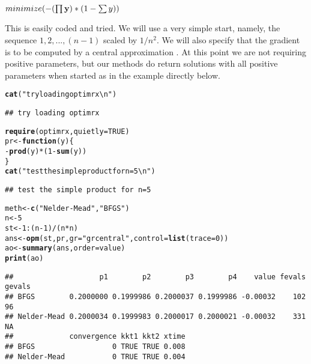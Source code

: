 \documentclass[11pt]{article}\usepackage[]{graphicx}\usepackage[]{color}
\makeatletter
\newcommand{\hlnum}[1]{\textcolor[rgb]{0.686,0.059,0.569}{#1}}%
\newcommand{\hlstr}[1]{\textcolor[rgb]{0.192,0.494,0.8}{#1}}%
\newcommand{\hlopt}[1]{\textcolor[rgb]{0,0,0}{#1}}%
\newcommand{\hlstd}[1]{\textcolor[rgb]{0.345,0.345,0.345}{#1}}%
\newcommand{\hlkwa}[1]{\textcolor[rgb]{0.161,0.373,0.58}{\textbf{#1}}}%
\newcommand{\hlkwb}[1]{\textcolor[rgb]{0.69,0.353,0.396}{#1}}%
\newcommand{\hlkwc}[1]{\textcolor[rgb]{0.333,0.667,0.333}{#1}}%
\newcommand{\hlkwd}[1]{\textcolor[rgb]{0.737,0.353,0.396}{\textbf{#1}}}%
\newenvironment{kframe}{%
 \def\at@end@of@kframe{}%
 \ifinner\ifhmode%
  \def\at@end@of@kframe{\end{minipage}}%
  \begin{minipage}{\columnwidth}%
 \fi\fi%
 \def\FrameCommand##1{\hskip\@totalleftmargin \hskip-\fboxsep
 \colorbox{shadecolor}{##1}\hskip-\fboxsep
     \hskip-\linewidth \hskip-\@totalleftmargin \hskip\columnwidth}%
 \MakeFramed {\advance\hsize-\width
   \@totalleftmargin\z@ \linewidth\hsize
   \@setminipage}}%
 {\par\unskip\endMakeFramed%
 \at@end@of@kframe}
\newenvironment{knitrout}{}{} %
\newcommand{\B}[1]{{\bf #1 \rm}}
\makeatother
\begin{document}
$ minimize ( - (\prod{\B{y}}) * (1 - \sum{y} ) ) $

\vspace*{10pt}
This is easily coded and tried. We will use a very simple start, namely, the sequence $1,2, ...,
(n-1)$ scaled by $1/n^2$. We will also specify that the gradient is to be computed by a 
central approximation \citep{optextras}. At this point we are not requiring positive
parameters, but our methods do return solutions with all positive parameters when started
as in the example directly below.

\begin{knitrout}\scriptsize
{}\color{fgcolor}\begin{kframe}
\begin{alltt}
\hlkwd{cat}\hlstd{(}\hlstr{"try loading optimrx\textbackslash{}n"}\hlstd{)}
\end{alltt}
\begin{verbatim}
## try loading optimrx
\end{verbatim}
\begin{alltt}
\hlkwd{require}\hlstd{(optimrx,} \hlkwc{quietly}\hlstd{=}\hlnum{TRUE}\hlstd{)}
\hlstd{pr} \hlkwb{<-} \hlkwa{function}\hlstd{(}\hlkwc{y}\hlstd{) \{}
\hlopt{-} \hlkwd{prod}\hlstd{(y)}\hlopt{*}\hlstd{(}\hlnum{1}\hlopt{-}\hlkwd{sum}\hlstd{(y))}
\hlstd{\}}
\hlkwd{cat}\hlstd{(}\hlstr{"test the simple product for n=5\textbackslash{}n"}\hlstd{)}
\end{alltt}
\begin{verbatim}
## test the simple product for n=5
\end{verbatim}
\begin{alltt}
\hlstd{meth} \hlkwb{<-} \hlkwd{c}\hlstd{(}\hlstr{"Nelder-Mead"}\hlstd{,} \hlstr{"BFGS"}\hlstd{)}
\hlstd{n}\hlkwb{<-}\hlnum{5}
  \hlstd{st}\hlkwb{<-}\hlnum{1}\hlopt{:}\hlstd{(n}\hlopt{-}\hlnum{1}\hlstd{)}\hlopt{/}\hlstd{(n}\hlopt{*}\hlstd{n)}
   \hlstd{ans}\hlkwb{<-}\hlkwd{opm}\hlstd{(st, pr,} \hlkwc{gr}\hlstd{=}\hlstr{"grcentral"}\hlstd{,} \hlkwc{control}\hlstd{=}\hlkwd{list}\hlstd{(}\hlkwc{trace}\hlstd{=}\hlnum{0}\hlstd{))}
   \hlstd{ao}\hlkwb{<-}\hlkwd{summary}\hlstd{(ans,}\hlkwc{order}\hlstd{=value)}
\hlkwd{print}\hlstd{(ao)}
\end{alltt}
\begin{verbatim}
##                    p1        p2        p3        p4    value fevals gevals
## BFGS        0.2000000 0.1999986 0.2000037 0.1999986 -0.00032    102     96
## Nelder-Mead 0.2000034 0.1999983 0.2000017 0.2000021 -0.00032    331     NA
##             convergence kkt1 kkt2 xtime
## BFGS                  0 TRUE TRUE 0.008
## Nelder-Mead           0 TRUE TRUE 0.004
\end{verbatim}
\end{kframe}
\end{knitrout}
\end{document}
